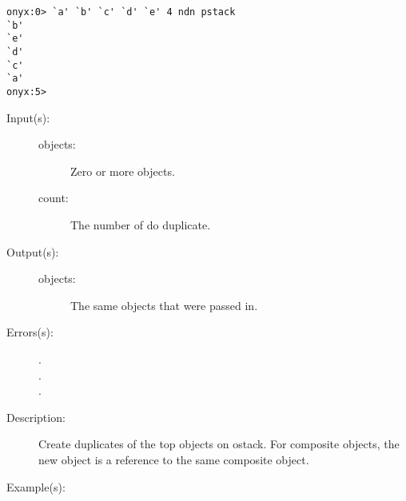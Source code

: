 \begin{description}
\begin{description}
\begin{verbatim}
onyx:0> `a' `b' `c' `d' `e' 4 ndn pstack
`b'
`e'
`d'
`c'
`a'
onyx:5>
		\end{verbatim}
	\end{description}
\label{systemdict:ndup}
\item[{\onyxop{objects count}{ndup}{objects objects}}: ]
	\begin{description}\item[]
	\item[Input(s): ]
		\begin{description}\item[]
		\item[objects: ]
			Zero or more objects.
		\item[count: ]
			The number of  do duplicate.
		\end{description}
	\item[Output(s): ]
		\begin{description}\item[]
		\item[objects: ]
			The same objects that were passed in.
		\end{description}
	\item[Errors(s): ]
		\begin{description}\item[]
		\item[.]
		\item[.]
		\item[.]
		\end{description}
	\item[Description: ]
		Create duplicates of the top  objects on ostack.
		For composite objects, the new object is a reference to the same
		composite object.
	\item[Example(s): ]\begin{verbatim}


\end{verbatim}
\end{description}
\end{description}
